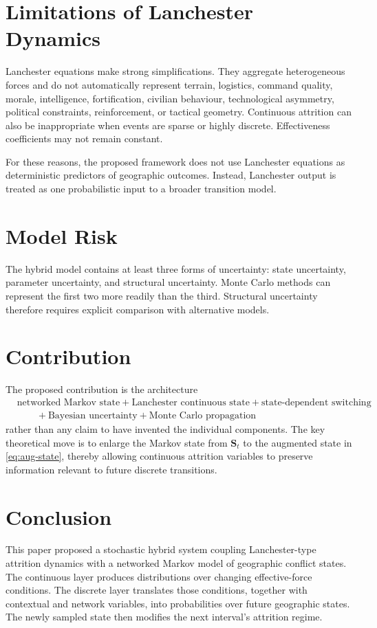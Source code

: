 \documentclass[11pt,letterpaper]{article}
\begin{document}
\section{Limitations of Lanchester Dynamics}
Lanchester equations make strong simplifications. They aggregate heterogeneous forces and do not automatically represent terrain, logistics, command quality, morale, intelligence, fortification, civilian behaviour, technological asymmetry, political constraints, reinforcement, or tactical geometry. Continuous attrition can also be inappropriate when events are sparse or highly discrete. Effectiveness coefficients may not remain constant.

For these reasons, the proposed framework does not use Lanchester equations as deterministic predictors of geographic outcomes. Instead, Lanchester output is treated as one probabilistic input to a broader transition model.

\section{Model Risk}
The hybrid model contains at least three forms of uncertainty: state uncertainty, parameter uncertainty, and structural uncertainty. Monte Carlo methods can represent the first two more readily than the third. Structural uncertainty therefore requires explicit comparison with alternative models.

\section{Contribution}
The proposed contribution is the architecture
\begin{equation}
\begin{aligned}
&\text{networked Markov state}+\text{Lanchester continuous state}+\text{state-dependent switching}\\
&\qquad+\text{Bayesian uncertainty}+\text{Monte Carlo propagation}
\end{aligned}
\end{equation}
rather than any claim to have invented the individual components. The key theoretical move is to enlarge the Markov state from $\mathbf{S}_t$ to the augmented state in \cref{eq:aug-state}, thereby allowing continuous attrition variables to preserve information relevant to future discrete transitions.

\section{Conclusion}
This paper proposed a stochastic hybrid system coupling Lanchester-type attrition dynamics with a networked Markov model of geographic conflict states. The continuous layer produces distributions over changing effective-force conditions. The discrete layer translates those conditions, together with contextual and network variables, into probabilities over future geographic states. The newly sampled state then modifies the next interval's attrition regime.
\end{document}
